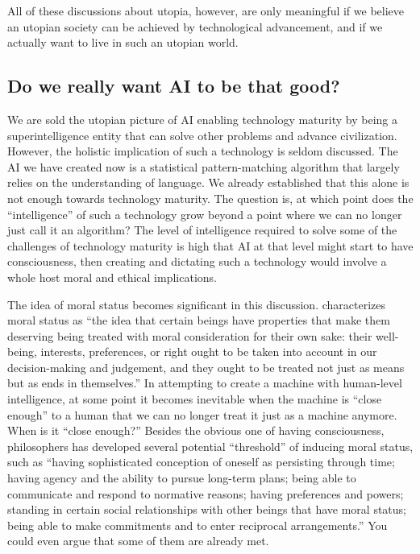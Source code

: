 \documentclass[12pt]{article}
\begin{document}
All of these discussions about utopia, however, are only meaningful if we believe an utopian society can be achieved by technological advancement, and if we actually want to live in such an utopian world.

\subsection{Do we really want AI to be that good?} \label{moralstatus}
We are sold the utopian picture of AI enabling technology maturity by being a superintelligence entity that can solve other problems and advance civilization. However, the holistic implication of such a technology is seldom discussed. The AI we have created now is a statistical pattern-matching algorithm that largely relies on the understanding of language. We already established that this alone is not enough towards technology maturity. The question is, at which point does the ``intelligence'' of such a technology grow beyond a point where we can no longer just call it an algorithm? The level of intelligence required to solve some of the challenges of technology maturity is high that AI at that level might start to have consciousness, then creating and dictating such a technology would involve a whole host moral and ethical implications.

The idea of moral status becomes significant in this discussion. \cite{bostromdeeputopia} characterizes moral status as ``the idea that certain beings have properties that make them deserving being treated with moral consideration for their own sake: their well-being, interests, preferences, or right ought to be taken into account in our decision-making and judgement, and they ought to be treated not just as means but as ends in themselves.'' In attempting to create a machine with human-level intelligence, at some point it becomes inevitable when the machine is ``close enough'' to a human that we can no longer treat it just as a machine anymore. When is it ``close enough?'' Besides the obvious one of having consciousness, philosophers has developed several potential ``threshold'' of inducing moral status, such as ``having sophisticated conception of oneself as persisting through time; having agency and the ability to pursue long-term plans; being able to communicate and respond to normative reasons; having preferences and powers; standing in certain social relationships with other beings that have moral status; being able to make commitments and to enter reciprocal arrangements.'' You could even argue that some of them are already met.
\end{document}
